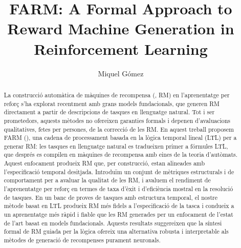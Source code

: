 \documentclass[11pt,english,listoffigures,listoftables, listofalgorithms]{tfgetsinf}
\title{FARM: A Formal Approach to Reward Machine Generation in Reinforcement Learning }
\author{Miquel Gómez}
\begin{document}

\begin{abstract}
La construcció automàtica de màquines de recompensa (, RM) en l'aprenentatge per reforç s'ha explorat recentment amb grans models fundacionals, que generen RM directament a partir de descripcions de tasques en llenguatge natural. Tot i ser prometedors, aquests mètodes no ofereixen garanties formals i depenen d'avaluacions qualitatives, fetes per persones, de la correcció de les RM. En aquest treball proposem FARM (), una cadena de processament basada en la lògica temporal lineal (LTL) per a generar RM: les tasques en llenguatge natural es tradueixen primer a fórmules LTL, que després es compilen en màquines de recompensa amb eines de la teoria d'autòmats. Aquest enfocament produeix RM que, per construcció, estan alineades amb l'especificació temporal desitjada. Introduïm un conjunt de mètriques estructurals i de comportament per a avaluar la qualitat de les RM, i avaluem el rendiment de l'aprenentatge per reforç en termes de taxa d'èxit i d'eficiència mostral en la resolució de tasques. En un banc de proves de tasques amb estructura temporal, el nostre mètode basat en LTL produeix RM més fidels a l'especificació de la tasca i condueix a un aprenentatge més ràpid i fiable que les RM generades per un enfocament de l'estat de l'art basat en models fundacionals. Aquests resultats suggereixen que la síntesi formal de RM guiada per la lògica ofereix una alternativa robusta i interpretable als mètodes de generació de recompenses purament neuronals.
\end{abstract}
\end{document}

